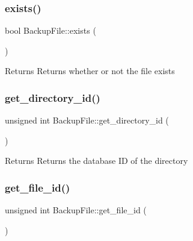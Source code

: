 \subsubsection{\texorpdfstring{exists()}{exists()}}
{\footnotesize\ttfamily bool Backup\+File\+::exists (\begin{DoxyParamCaption}{ }\end{DoxyParamCaption})}

\begin{DoxyReturn}{Returns}
Returns whether or not the file exists 
\end{DoxyReturn}
\mbox{\label{class_backup_1_1_file_1_1_backup_file_ada76c8701596d88b1c12fefe7687c5b4}} 
\subsubsection{\texorpdfstring{get\+\_\+directory\+\_\+id()}{get\_directory\_id()}}
{\footnotesize\ttfamily unsigned int Backup\+File\+::get\+\_\+directory\+\_\+id (\begin{DoxyParamCaption}{ }\end{DoxyParamCaption})}

\begin{DoxyReturn}{Returns}
Returns the database ID of the directory 
\end{DoxyReturn}
\mbox{\label{class_backup_1_1_file_1_1_backup_file_a53e76e663bc651d68cfa9010788fee99}} 
\subsubsection{\texorpdfstring{get\+\_\+file\+\_\+id()}{get\_file\_id()}}
{\footnotesize\ttfamily unsigned int Backup\+File\+::get\+\_\+file\+\_\+id (\begin{DoxyParamCaption}{ }\end{DoxyParamCaption})}

